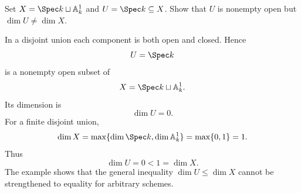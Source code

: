 \begin{problem}\label{prob:vi30-02}
Set \(X=\Spec k\sqcup\mathbb A^1_k\) and \(U=\Spec k\subseteq X\). Show that \(U\) is nonempty open but \(\dim U\neq\dim X\).

\end{problem}

\ifdefined\FullProblemDossiers
\begin{solution}
In a disjoint union each component is both open and closed. Hence
\[
U=\Spec k
\]
is a nonempty open subset of
\[
X=\Spec k\sqcup\mathbb A^1_k.
\]
Its dimension is
\[
\dim U=0.
\]
For a finite disjoint union,
\[
\dim X
=
\max\{\dim\Spec k,\dim\mathbb A^1_k\}
=
\max\{0,1\}
=
1.
\]
Thus
\[
\boxed{\dim U=0<1=\dim X}.
\]
The example shows that the general inequality \(\dim U\le\dim X\) cannot be strengthened to equality for arbitrary
schemes.
\end{solution}
\fi
